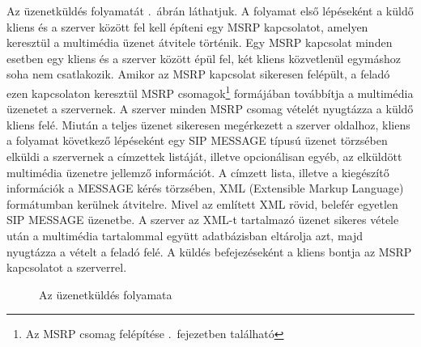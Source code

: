 Az üzenetküldés folyamatát .~ábrán láthatjuk. A folyamat első lépéseként a küldő kliens és a szerver között fel kell építeni egy MSRP kapcsolatot, amelyen keresztül a multimédia üzenet átvitele történik. Egy MSRP kapcsolat minden esetben egy kliens és a szerver között épül fel, két kliens közvetlenül egymáshoz soha nem csatlakozik. Amikor az MSRP kapcsolat sikeresen felépült, a feladó ezen kapcsolaton keresztül MSRP csomagok\footnote{Az MSRP csomag felépítése .~fejezetben található} formájában továbbítja a multimédia üzenetet a szervernek. A szerver minden MSRP csomag vételét nyugtázza a küldő kliens felé. Miután a teljes üzenet sikeresen megérkezett a szerver oldalhoz, kliens a folyamat következő lépéseként egy SIP MESSAGE típusú üzenet törzsében elküldi a szervernek a címzettek listáját, illetve opcionálisan egyéb, az elküldött multimédia üzenetre jellemző információt. A címzett lista, illetve a kiegészítő információk a MESSAGE kérés törzsében, XML (Extensible Markup Language) formátumban kerülnek átvitelre. Mivel az említett XML rövid, belefér egyetlen SIP MESSAGE üzenetbe. A szerver az XML-t tartalmazó üzenet sikeres vétele után a multimédia tartalommal együtt adatbázisban eltárolja azt, majd nyugtázza a vételt a feladó felé. A küldés befejezéseként a kliens bontja az MSRP kapcsolatot a szerverrel.

\begin{figure}[htbp]
\center
{}
\caption{Az üzenetküldés folyamata}
\label{fig:sending_proc}
\end{figure}

